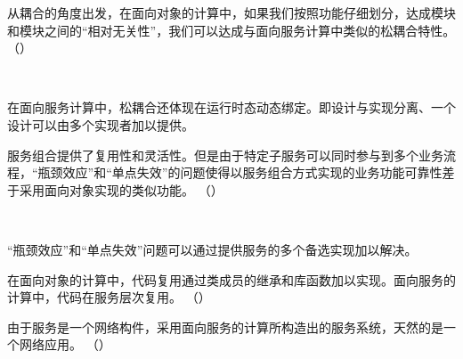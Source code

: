 \begin{problem}
	从耦合的角度出发，在面向对象的计算中，如果我们按照功能仔细划分，达成模块和模块之间的“相对无关性”，我们可以达成与面向服务计算中类似的松耦合特性。
	\hfill （）
\end{problem}
\\ \begin{solution}
	在面向服务计算中，松耦合还体现在运行时态动态绑定。即设计与实现分离、一个设计可以由多个实现者加以提供。
\end{solution}


\begin{problem}
	‌服务组合提供了复用性和灵活性。但是由于特定子服务可以同时参与到多个业务流程，“瓶颈效应”和“单点失效”的问题使得以服务组合方式实现的业务功能可靠性差于采用面向对象实现的类似功能。
	\hfill （）
\end{problem}
\\ \begin{solution}
	“瓶颈效应”和“单点失效”问题可以通过提供服务的多个备选实现加以解决。
\end{solution}


\begin{problem}
	在面向对象的计算中，代码复用通过类成员的继承和库函数加以实现。面向服务的计算中，代码在服务层次复用。
	\hfill （）
\end{problem}


\begin{problem}
	由于服务是一个网络构件，采用面向服务的计算所构造出的服务系统，天然的是一个网络应用。
	\hfill （）
\end{problem}


